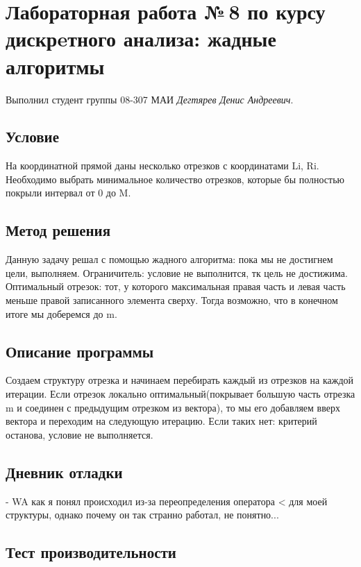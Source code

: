 \documentclass[12pt]{article}
\begin{document}
\section*{Лабораторная работа №\,8 по курсу дискрeтного анализа: жадные алгоритмы}

Выполнил студент группы 08-307 МАИ \textit{Дегтярев Денис Андреевич}.

\subsection*{Условие}

На координатной прямой даны несколько отрезков с координатами Li, Ri. Необходимо выбрать минимальное количество отрезков, которые бы полностью покрыли интервал от 0 до M.

\subsection*{Метод решения}

Данную задачу решал с помощью жадного алгоритма: пока мы не достигнем цели, выполняем. Ограничитель: условие не выполнится, тк цель не достижима. 
Оптимальный отрезок: тот, у которого максимальная правая часть и левая часть меньше правой записанного элемента сверху.
Тогда возможно, что в конечном итоге мы доберемся до m.

\subsection*{Описание программы}

Создаем структуру отрезка и начинаем перебирать каждый из отрезков на каждой итерации. Если отрезок локально оптимальный(покрывает большую часть отрезка m и соединен с 
предыдущим отрезком из вектора), то мы его добавляем вверх вектора и переходим на следующую итерацию. Если таких нет: критерий останова, условие не выполняется.

\subsection*{Дневник отладки}

    - WA как я понял происходил из-за переопределения оператора < для моей структуры, однако почему он так странно работал, не понятно...


\subsection*{Тест производительности}
\end{document}
